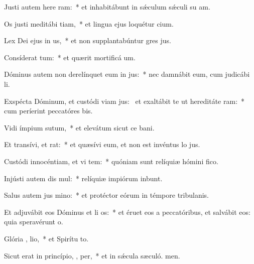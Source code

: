 \item Justi autem here ram:~* et inhabitábunt in sǽculum sǽculi su am.
\item Os justi meditábi tiam,~* et lingua ejus loquétur cium.
\item Lex Dei ejus in  us,~* et non supplantabúntur gres jus.
\item Consíderat  tum:~* et quærit mortificá um.
\item Dóminus autem non derelínquet eum in  jus:~* nec damnábit eum, cum judicábi li.
\item Exspécta Dóminum, et custódi viam jus:~\pscross{} et exaltábit te ut hereditáte  ram:~* cum períerint peccatóres bis.
\item Vidi ímpium sutum,~* et elevátum sicut ce bani.
\item Et transívi, et   rat:~* et quæsívi eum, et non est invéntus lo jus.
\item Custódi innocéntiam, et vi tem:~* quóniam sunt relíquiæ hómini fico.
\item Injústi autem dis mul:~* relíquiæ impiórum inbunt.
\item Salus autem jus  mino:~* et protéctor eórum in témpore tribulanis.
\item Et adjuvábit eos Dóminus et li os:~* et éruet eos a peccatóribus, et salvábit eos: quia speravérunt  o.
\item Glória ,  lio,~* et Spirítu to.
\item Sicut erat in princípio,  ,  per,~* et in sǽcula sæculó. men.
